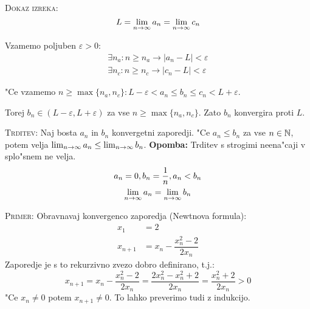 \textsc{Dokaz izreka:}
\begin{equation*}
L = \lim_{n \rightarrow \infty}a_n = \lim_{n \rightarrow \infty}c_n
\end{equation*}
\begin{multicols}{2}
Vzamemo poljuben $\varepsilon > 0$:
\columnbreak
\begin{gather*}
\exists n_a: n \geq n_a \rightarrow |a_n - L| < \varepsilon \\
\exists n_c: n \geq n_c \rightarrow |c_n - L| < \varepsilon
\end{gather*}
\end{multicols}
"Ce vzamemo $n \geq \max \{n_a, n_c\}: L - \varepsilon < a_n \leq b_n \leq c_n < L + \varepsilon$.

Torej $b_n \in (L - \varepsilon, L + \varepsilon)$ za vse $n \geq \max \{n_a, n_c\}$. Zato $b_n$ konvergira proti $L$.

\textsc{Trditev:} Naj bosta $a_n$ in $b_n$ konvergetni zaporedji. "Ce $a_n \leq b_n$ za vse $n \in \mathbb{N}$, potem velja $\lim_{n \rightarrow \infty} a_n \leq \lim_{n \rightarrow \infty} b_n$. \textbf{Opomba:} Trditev s strogimi neena"caji v splo"snem ne velja.
\begin{gather*}
a_n = 0, b_n = \dfrac{1}{n}, a_n < b_n\\
\lim_{n \rightarrow \infty}a_n = \lim_{n \rightarrow \infty}b_n
\end{gather*}

\textsc{Primer:} Obravnavaj konvergenco zaporedja (Newtnova formula):
\begin{align*}
x_1 &= 2 \\
x_{n+1} &= x_n - \dfrac{x_n^2 - 2}{2 x_n}
\end{align*}
Zaporedje je s to rekurzivno zvezo dobro definirano, t.j.: 
\begin{equation*}
x_{n+1} = x_n - \dfrac{x_n^2 - 2}{2x_n} = \dfrac{2x_n^2 - x_n^2 + 2}{2x_n} = \dfrac{x_n^2 + 2}{2x_n} > 0
\end{equation*}
"Ce $x_n \neq 0$ potem $x_{n+1} \neq 0$. To lahko preverimo tudi z indukcijo.


